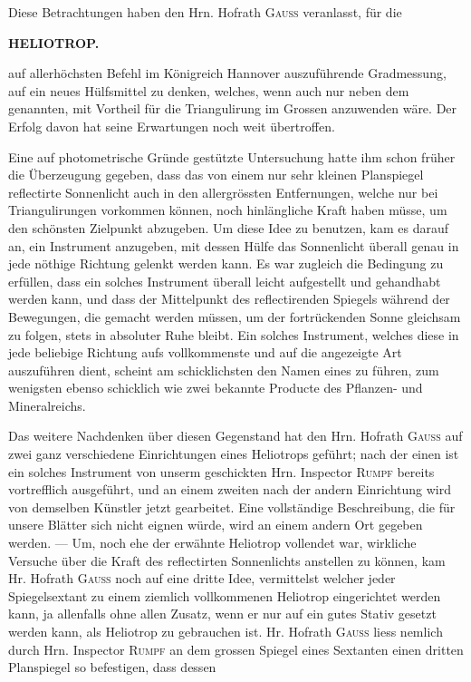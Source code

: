\par\noindent\hspace*{\parindent}Diese Betrachtungen haben den Hrn. Hofrath \textsc{Gauss} veranlasst, für die

\par\clearpage
\noindent{}\hfill{\small\textbf{HELIOTROP.}}\hfill\null\par\medskip
\noindent auf allerhöchsten Befehl im Königreich Hannover auszuführende Gradmessung, auf ein neues Hülfsmittel zu denken, welches, wenn auch nur neben dem genannten, mit Vortheil für die Triangulirung im Grossen anzuwenden wäre. Der Erfolg davon hat seine Erwartungen noch weit übertroffen.

\par\noindent\hspace*{\parindent}Eine auf photometrische Gründe gestützte Untersuchung hatte ihm schon früher die Überzeugung gegeben, dass das von einem nur sehr kleinen Planspiegel reflectirte Sonnenlicht auch in den allergrössten Entfernungen, welche nur bei Triangulirungen vorkommen können, noch hinlängliche Kraft haben müsse, um den schönsten Zielpunkt abzugeben. Um diese Idee zu benutzen, kam es darauf an, ein Instrument anzugeben, mit dessen Hülfe das Sonnenlicht überall genau in jede nöthige Richtung gelenkt werden kann. Es war zugleich die Bedingung zu erfüllen, dass ein solches Instrument überall leicht aufgestellt und gehandhabt werden kann, und dass der Mittelpunkt des reflectirenden Spiegels während der Bewegungen, die gemacht werden müssen, um der fortrückenden Sonne gleichsam zu folgen, stets in absoluter Ruhe bleibt. Ein solches Instrument, welches diese  in jede beliebige Richtung aufs vollkommenste und auf die angezeigte Art auszuführen dient, scheint am schicklichsten den Namen eines  zu führen, zum wenigsten ebenso schicklich wie zwei bekannte Producte des Pflanzen- und Mineralreichs.

\par\noindent\hspace*{\parindent}Das weitere Nachdenken über diesen Gegenstand hat den Hrn. Hofrath \textsc{Gauss} auf zwei ganz verschiedene Einrichtungen eines Heliotrops geführt; nach der einen ist ein solches Instrument von unserm geschickten Hrn. Inspector \textsc{Rumpf} bereits vortrefflich ausgeführt, und an einem zweiten nach der andern Einrichtung wird von demselben Künstler jetzt gearbeitet. Eine vollständige Beschreibung, die für unsere Blätter sich nicht eignen würde, wird an einem andern Ort gegeben werden. --- Um, noch ehe der erwähnte Heliotrop vollendet war, wirkliche Versuche über die Kraft des reflectirten Sonnenlichts anstellen zu können, kam Hr. Hofrath \textsc{Gauss} noch auf eine dritte Idee, vermittelst welcher jeder Spiegelsextant zu einem ziemlich vollkommenen Heliotrop eingerichtet werden kann, ja allenfalls ohne allen Zusatz, wenn er nur auf ein gutes Stativ gesetzt werden kann, als Heliotrop zu gebrauchen ist. Hr. Hofrath \textsc{Gauss} liess nemlich durch Hrn. Inspector \textsc{Rumpf} an dem grossen Spiegel eines Sextanten einen dritten Planspiegel so befestigen, dass dessen

